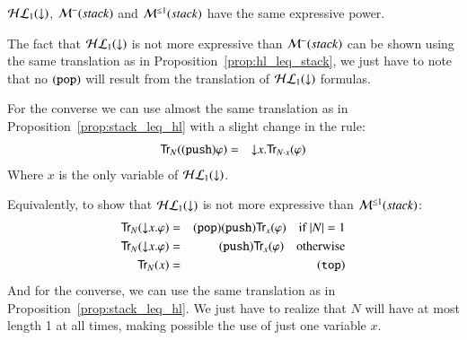 \begin{pro}
$\mathcal{HL}_1({\downarrow})$, $\mathcal{M}^-(stack)$ and $\mathcal{M}^{\leq 1}(stack)$ have the same expressive
power.
\end{pro}
\begin{pf}
The fact that $\mathcal{HL}_1({\downarrow})$ is not more expressive than $\mathcal{M}^-(stack)$ can
be shown using the same translation as in
Proposition~\ref{prop:hl_leq_stack}, we just have to note that no
${\tt (pop)}$ will result from the translation of $\mathcal{HL}_1({\downarrow})$ formulas.

For the converse we can use almost the same translation as in
Proposition~\ref{prop:stack_leq_hl} with a slight change in the
rule:
\begin{eqnarray*}
{\sf Tr}_N({\tt (push)} \varphi) & = & {\downarrow} x. {\sf Tr}_{N\cdot x}(\varphi)
\end{eqnarray*}
Where $x$ is the only variable of $\mathcal{HL}_1({\downarrow})$.

\smallskip

Equivalently, to show that $\mathcal{HL}_1({\downarrow})$ is not more expressive than
$\mathcal{M}^{\leq 1}(stack)$:
\begin{eqnarray*}
{\sf Tr}_N({\downarrow} x.\varphi) & = & {\tt (pop)}{\tt (push)}{\sf Tr}_{x}(\varphi) \quad \textrm{if } |N|=1\\
{\sf Tr}_N({\downarrow} x.\varphi) & = & {\tt (push)}{\sf Tr}_{x}(\varphi) \quad \textrm{otherwise}\\
{\sf Tr}_N(x) & = & {\tt (top)}
\end{eqnarray*}
And for the converse, we can use the same translation as in
Proposition~\ref{prop:stack_leq_hl}. We just have to realize that
$N$ will have at most length 1 at all times, making possible the use
of just one variable $x$.
\end{pf}
